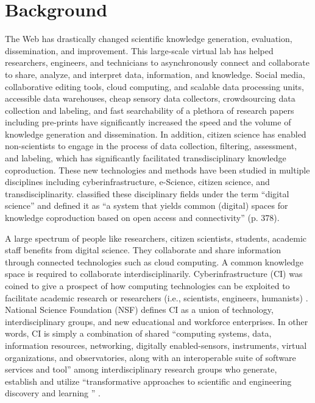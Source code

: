 \documentclass[acmsmall,authordraft]{acmart}
\begin{document}
\section{Background}
The Web has drastically changed scientific knowledge generation, evaluation, dissemination, and improvement. This large-scale virtual lab has helped researchers, engineers, and technicians to asynchronously connect and collaborate to share, analyze, and interpret data, information, and knowledge. Social media, collaborative editing tools, cloud computing, and scalable data processing units, accessible data warehouses, cheap sensory data collectors, crowdsourcing data collection and labeling, and fast searchability of a plethora of research papers including pre-prints have significantly increased the speed and the volume of knowledge generation and dissemination. In addition, citizen science has enabled non-scientists to engage in the process of data collection, filtering, assessment, and labeling, which has significantly facilitated transdisciplinary knowledge coproduction. These new technologies and methods have been studied in multiple disciplines including cyberinfrastructure, e-Science, citizen science, and transdisciplinarity. \citet{pacheco2018digital} classified these disciplinary fields under the term ``digital science'' and defined it as ``a system that yields common (digital) spaces for knowledge coproduction based on open access and connectivity'' (p. 378).

A large spectrum of people like researchers, citizen scientists, students, academic staff benefits from digital science.  They collaborate and share information through connected technologies such as cloud computing. A common knowledge space is required to collaborate interdisciplinarily. \citep[p.~5,6]{pacheco2018digital} 
Cyberinfrastructure (CI) was coined to give a prospect of how computing technologies can be exploited to facilitate academic research or researchers (i.e., scientists, engineers, humanists) \citep{atkins2003revolutionizing}.  National Science Foundation (NSF) defines CI as a union of technology, interdisciplinary groups, and new educational and workforce enterprises.  In other words, CI is simply a combination of shared ``computing systems, data, information resources, networking, digitally enabled-sensors, instruments, virtual organizations, and observatories, along with an interoperable suite of software services and tool'' among interdisciplinary  research groups who generate, establish and utilize ``transformative approaches to scientific and engineering discovery and learning \citep{council2007cyberinfrastructure}'' \citep[p.~2]{pacheco2018digital}.
\end{document}

